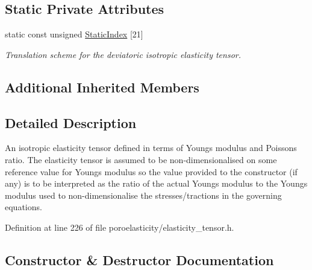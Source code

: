 \subsection*{Static Private Attributes}
\begin{DoxyCompactItemize}
\item 
static const unsigned \hyperlink{classoomph_1_1DeviatoricIsotropicElasticityTensor_a073434d42a9e9f9520abe64c3e720337}{Static\+Index} \mbox{[}21\mbox{]}
\begin{DoxyCompactList}\small\item\em Translation scheme for the deviatoric isotropic elasticity tensor. \end{DoxyCompactList}\end{DoxyCompactItemize}
\subsection*{Additional Inherited Members}


\subsection{Detailed Description}
An isotropic elasticity tensor defined in terms of Young\textquotesingle{}s modulus and Poisson\textquotesingle{}s ratio. The elasticity tensor is assumed to be non-\/dimensionalised on some reference value for Young\textquotesingle{}s modulus so the value provided to the constructor (if any) is to be interpreted as the ratio of the actual Young\textquotesingle{}s modulus to the Young\textquotesingle{}s modulus used to non-\/dimensionalise the stresses/tractions in the governing equations. 

Definition at line 226 of file poroelasticity/elasticity\+\_\+tensor.\+h.



\subsection{Constructor \& Destructor Documentation}
\mbox{\label{classoomph_1_1DeviatoricIsotropicElasticityTensor_a1b4b704637b2e90c96d3b53b3c865ec8}} 
